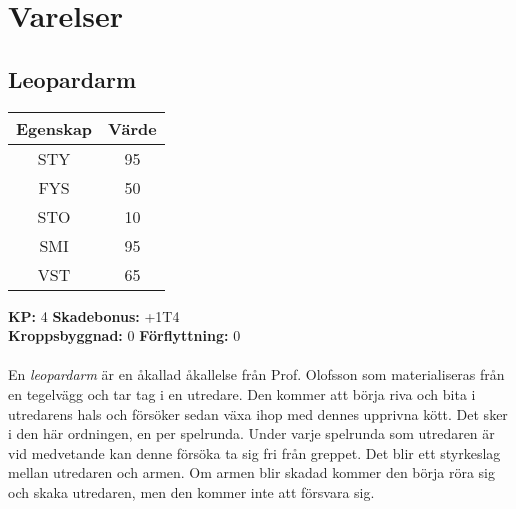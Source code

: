 \section{Varelser}
%
\subsection{Leopardarm}
\label{var:Leopardarm}
%
\begin{center}
	\begin{tabular}{ | c | c | }
		\hline
		Egenskap & Värde \\
		\hline
		STY & 95 \\
		FYS & 50 \\
		STO & 10 \\
		SMI & 95 \\
		VST & 65 \\
		\hline
	\end{tabular}
\end{center}
%
\textbf{KP:} 4 \quad \textbf{Skadebonus:} +1T4 \\
\textbf{Kroppsbyggnad:} 0 \quad \textbf{Förflyttning:} 0 \\
\\
En \textit{leopardarm} är en åkallad åkallelse från Prof. Olofsson som materialiseras från en tegelvägg och tar tag i en utredare. Den kommer att börja riva och bita i utredarens hals och försöker sedan växa ihop med dennes upprivna kött. Det sker i den här ordningen, en per spelrunda. Under varje spelrunda som utredaren är vid medvetande kan denne försöka ta sig fri från greppet. Det blir ett styrkeslag mellan utredaren och armen. Om armen blir skadad kommer den börja röra sig och skaka utredaren, men den kommer inte att försvara sig.

